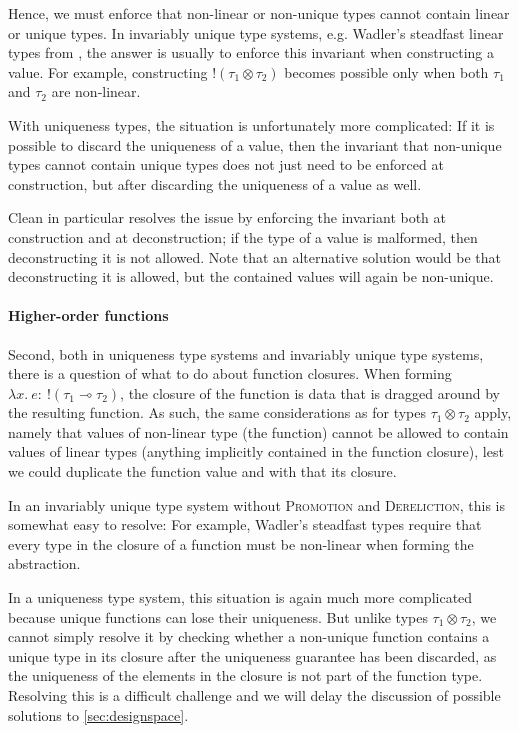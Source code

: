 Hence, we must enforce that non-linear or non-unique types cannot contain linear or unique types. In invariably unique type systems, e.g. Wadler's steadfast linear types from \cite{wadler_is_1991}, the answer is usually to enforce this invariant when constructing a value. For example, constructing $!(\tau_1 \otimes \tau_2)$ becomes possible only when both $\tau_1$ and $\tau_2$ are non-linear.

With uniqueness types, the situation is unfortunately more complicated: If it is possible to discard the uniqueness of a value, then the invariant that non-unique types cannot contain unique types does not just need to be enforced at construction, but after discarding the uniqueness of a value as well. 

Clean in particular resolves the issue by enforcing the invariant both at construction and at deconstruction; if the type of a value is malformed, then deconstructing it is not allowed. Note that an alternative solution would be that deconstructing it is allowed, but the contained values will again be non-unique.

\paragraph{Higher-order functions} Second, both in uniqueness type systems and invariably unique type systems, there is a question of what to do about function closures. When forming $\lambda x.\ e :\ !(\tau_1 \multimap \tau_2)$, the closure of the function is data that is dragged around by the resulting function. As such, the same considerations as for types $\tau_1 \otimes \tau_2$ apply, namely that values of non-linear type (the function) cannot be allowed to contain values of linear types (anything implicitly contained in the function closure), lest we could duplicate the function value and with that its closure. 

In an invariably unique type system without \textsc{Promotion} and \textsc{Dereliction}, this is somewhat easy to resolve: For example, Wadler's steadfast types require that every type in the closure of a function must be non-linear when forming the abstraction.

In a uniqueness type system, this situation is again much more complicated because unique functions can lose their uniqueness. But unlike types $\tau_1 \otimes \tau_2$, we cannot simply resolve it by checking whether a non-unique function contains a unique type in its closure after the uniqueness guarantee has been discarded, as the uniqueness of the elements in the closure is not part of the function type. Resolving this is a difficult challenge and we will delay the discussion of possible solutions to \cref{sec:designspace}.

